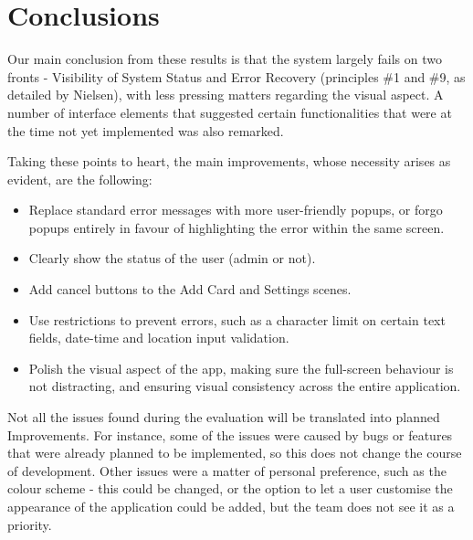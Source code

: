 \section{Conclusions}


Our main conclusion from these results is that the system largely fails on two fronts - Visibility of System Status and Error Recovery (principles \#1 and \#9, as detailed by Nielsen), with less pressing matters regarding the visual aspect. A number of interface elements that suggested certain functionalities that were at the time not yet implemented was also remarked. 

Taking these points to heart, the main improvements, whose necessity arises as evident, are the following:
\begin{itemize}
    \item Replace standard error messages with more user-friendly popups, or forgo popups entirely in favour of highlighting the error within the same screen.
    \item Clearly show the status of the user (admin or not).
    \item Add cancel buttons to the Add Card and Settings scenes.
    \item Use restrictions to prevent errors, such as a character limit on certain text fields, date-time and location input validation.
    \item Polish the visual aspect of the app, making sure the full-screen behaviour is not distracting, and ensuring visual consistency across the entire application. 
\end{itemize}

Not all the issues found during the evaluation will be translated into planned Improvements. For instance, some of the issues were caused by bugs or features that were already planned to be implemented, so this does not change the course of development. Other issues were a matter of personal preference, such as the colour scheme - this could be changed, or the option to let a user customise the appearance of the application could be added, but the team does not see it as a priority. 

